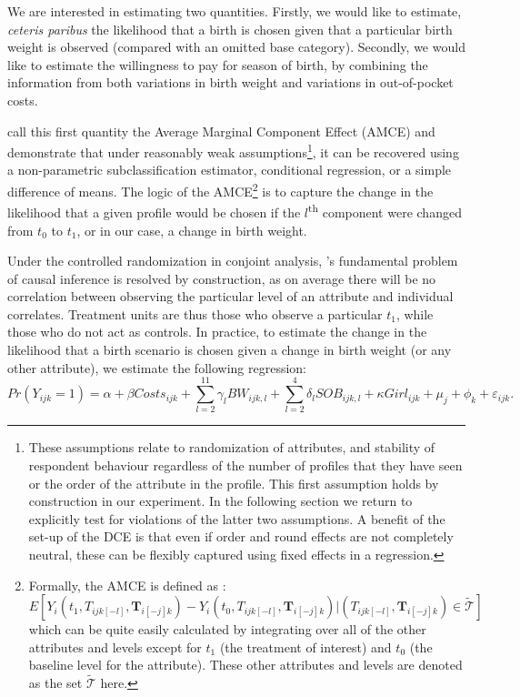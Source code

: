 \documentclass[a4paper, 11pt]{article}
\begin{document}
\begin{spacing}{1.4}
We are interested in estimating two quantities.  Firstly, we would like to
estimate, \emph{ceteris paribus} the likelihood that a birth is chosen given
that a particular birth weight is observed (compared with an omitted base
category).  Secondly, we would like to estimate the willingness to pay for
season of birth, by combining the information from both variations in birth
weight and variations in out-of-pocket costs.

\citet{Hainmuelleretal2013} call this first quantity the Average Marginal
Component Effect (AMCE) and demonstrate that under reasonably weak
assumptions\footnote{These assumptions relate to randomization of attributes,
  and stability of respondent behaviour regardless of the number of profiles
  that they have seen or the order of the attribute in the profile.  This
  first assumption holds by construction in our experiment.  In the following
  section we return to explicitly test for violations of the latter two
  assumptions.  A benefit of the set-up of the DCE is that even if order and
  round effects are not completely neutral, these can be flexibly captured
  using fixed effects in a regression.}, it can be recovered using a
non-parametric subclassification
estimator, conditional regression, or a simple difference of means.  The
logic of the AMCE\footnote{Formally, the AMCE is defined as
  \citep{Hainmuelleretal2013}:
  \[
  E[Y_i(t_1,T_{ijk[-l]},\mathbf{T}_{i[-j]k})-Y_i(t_0,T_{ijk[-l]},\mathbf{T}_{i[-j]k})|(T_{ijk[-l]},\mathbf{T}_{i[-j]k})\in\tilde{\mathcal{T}}]
  \]
  which can be quite easily calculated by integrating over all of the other
  attributes and levels except for $t_1$ (the treatment of interest) and $t_0$
  (the baseline level for the attribute). These other attributes and levels are
  denoted as the set $\tilde{\mathcal{T}}$ here.} is to capture the change in
the likelihood that a given profile would be chosen if the
$l$\textsuperscript{th} component were changed from $t_0$ to $t_1$, or in our
case, a change in birth weight.

Under the controlled randomization in conjoint analysis, \citet{Holland1986}'s
fundamental problem of causal inference is resolved by construction, as on
average there will be no correlation between observing the particular level
of an attribute and individual correlates. Treatment units are thus those who
observe a particular $t_1$, while those who do not act as controls.  In
practice, to estimate the change in the likelihood that a birth scenario is chosen given a change in birth weight
(or any other attribute), we estimate
the following regression:
\begin{equation}
  \label{ACMEreg}
Pr(Y_{ijk}=1) = \alpha + \beta Costs_{ijk} + \sum_{l=2}^{11} \gamma_l BW_{ijk,l} + \sum_{l=2}^{4} \delta_l SOB_{ijk,l} +  \kappa Girl_{ijk} + \mu_j + \phi_k + \varepsilon_{ijk}.
\end{equation}


\end{spacing}
\end{document}
